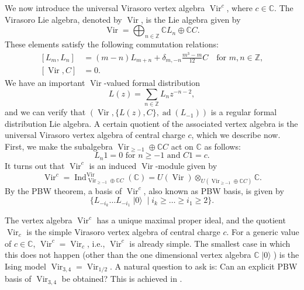 \documentclass[a4paper, 12pt, reqno]{amsart}
\theoremstyle{remark}
\DeclareMathOperator{\Vir}{Vir}
\DeclareMathOperator{\Ind}{Ind}
\DeclareMathOperator{\vac}{|0\rangle}
\DeclareMathOperator{\ad}{ad}
\begin{document}
We now introduce the universal Virasoro vertex algebra $\Vir^c$, where $c \in \mathbb{C}$.
The Virasoro Lie algebra, denoted by $\Vir$, is the Lie algebra given by
\begin{equation*}
  \Vir = \bigoplus_{n \in \mathbb{Z}}\mathbb{C}L_n \oplus \mathbb{C}C.
\end{equation*}
These elements satisfy the following commutation relations:
\begin{equation*}
  \begin{split}
    [L_m, L_n] &= (m - n)L_{m + n} + \delta_{m, -n}\frac{m^3 - m}{12}C \quad \text{for $m, n \in \mathbb{Z}$}, \\
    [\Vir, C] &= 0.
  \end{split}
\end{equation*}
We have an important $\Vir$-valued formal distribution
\begin{equation*}
  L(z) = \sum_{n \in \mathbb{Z}}L_nz^{-n - 2},
\end{equation*}
and we can verify that $(\Vir, \{L(z), C\}, \ad(L_{-1}))$ is a regular formal distribution Lie algebra.
A certain quotient of the associated vertex algebra is the universal Virasoro vertex algebra of central charge $c$, which we describe now.
First, we make the subalgebra $\Vir_{\ge -1} \oplus \mathbb{C}C$ act on $\mathbb{C}$ as follows:
\begin{equation*}
  \text{$L_n1 = 0$ for $n \ge -1$ and $C1 = c$}.
\end{equation*}
It turns out that $\Vir^c$ is an induced $\Vir$-module given by
\begin{equation*}
  \Vir^c = \Ind^{\Vir}_{\Vir_{\ge -1} \oplus \mathbb{C}C}(\mathbb{C}) = U(\Vir) \otimes_{U(\Vir_{\ge -1} \oplus \mathbb{C}C)} \mathbb{C}.
\end{equation*}
By the PBW theorem, a basis of $\Vir^c$, also known as PBW basis, is given by
\begin{equation*}
  \{L_{-i_k}\dots L_{-i_1}\vac \mid i_k \ge \dots \ge i_1 \ge 2\}.
\end{equation*}

The vertex algebra $\Vir^c$ has a unique maximal proper ideal, and the quotient $\Vir_c$ is the simple Virasoro vertex algebra of central charge $c$.
For a generic value of $c \in \mathbb{C}$, $\Vir^c = \Vir_c$, i.e., $\Vir^c$ is already simple.
The smallest case in which this does not happen (other than the one dimensional vertex algebra $\mathbb{C}\vac$) is the Ising model $\Vir_{3, 4} = \Vir_{1/2}$.
A natural question to ask is: Can an explicit PBW basis of $\Vir_{3, 4}$ be obtained?
This is achieved in \cite{andrews_singular_2022}.
\end{document}
